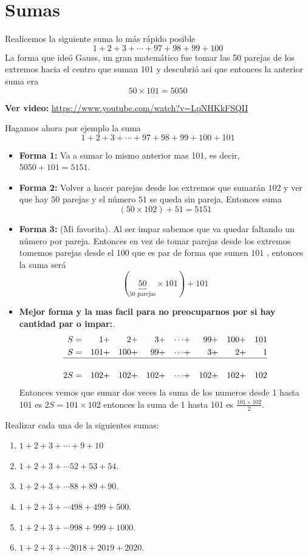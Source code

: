 \chapter{Sumas}\label{chapter_sumas}
Realicemos la siguiente suma lo más rápido posible
\[
	1+2+3+\cdots + 97+98+99+100
\]
La forma que ideó Gauss, un gran matemático fue tomar las 50 parejas de los extremos hacia el centro que suman 101 y descubrió asi que entonces la anterior suma era
\[
50\times 101=5050
\]

\textbf{Ver video:} \url{https://www.youtube.com/watch?v=LpNHKkFSQII}
\begin{ejemplo} Hagamos ahora por ejemplo la suma
	\[
			1+2+3+\cdots + 97+98+99+100+101
	\]
	\begin{itemize}
		\item \textbf{Forma 1:} Va a sumar lo mismo anterior mas 101, es decir, $5050+101=5151$.
		
		\item \textbf{Forma 2:} Volver a hacer parejas desde los extremos que sumarán $102$ y ver que hay $50$ parejas y el número $51$ se queda sin pareja. Entonces suma
		\[
		(50\times 102 ) + 51 =5151
		\]
		
		\item \textbf{Forma 3:} (Mi favorita). Al ser impar sabemos que va  quedar faltando un número por pareja. Entonces en vez de tomar parejas desde los extremos tomemos parejas desde el 100 que es par de forma que sumen $101$ , entonces la suma será
		\[
		(\underbrace{50}_{\text{50 parejas}}\times 101 ) + 101
		\]
		
		\item \textbf{Mejor forma y la mas facil para no preocuparnos por si hay cantidad par o impar:}.
			\begin{align*}
				S&= &1&+&2&+&3&+&\cdots &+ &99&+&100&+&101\\
				S&= &101&+&100&+&99&+&\cdots&+& 3&+&2&+&1\\
				\hline\\
				2S&= &102 &+ &102 &+ &102 &+ &\cdots&+ &102 &+ &102 &+ &102
			\end{align*}
			Entonces vemos que sumar dos veces la suma de los numeros desde 1 hasta 101 es $2S=101\times 102$ entonces la suma de 1 hasta 101 es $\frac{101\times 102}{2}$.		
	\end{itemize}
\end{ejemplo}

\begin{exer}
	Realizar cada una de la siguientes sumas:
	\begin{enumerate}[label=\Alph*)]
		\item $1+2+3+\cdots +9+10$
		\item $1+ 2+ 3+ \cdots 52+ 53+ 54$.
		\item $1+ 2+ 3+ \cdots 88+ 89+ 90$.
		\item $1+ 2+ 3+ \cdots 498+ 499+ 500$.
		\item $1+ 2+ 3+ \cdots 998+ 999+ 1000$.
		\item $1+ 2+ 3+ \cdots 2018+ 2019+ 2020$.
	\end{enumerate}
\end{exer}

